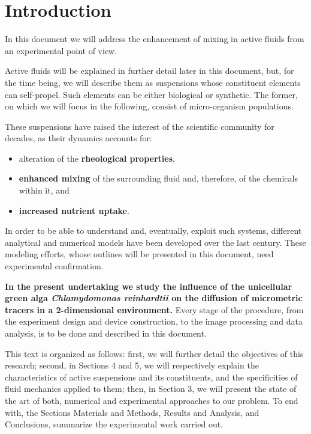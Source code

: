 \chapter{Introduction}
\label{introduction}

In this document we will address the enhancement of mixing in active fluids from an experimental point of view. 

Active fluids will be explained in further detail later in this document, but, for the time being, we will describe them as suspensions whose constituent elements can self-propel. Such elements can be either biological or synthetic. The former, on which we will focus in the following, consist of micro-organism populations.

These suspensions have raised the interest of the scientific community for decades, as their dynamics accounts for:

\begin{itemize}
	\item alteration of the \textbf{rheological properties},
	\item \textbf{enhanced mixing} of the surrounding fluid and, therefore, of the chemicals within it, and
	\item \textbf{increased nutrient uptake}.
\end{itemize}

In order to be able to understand and, eventually, exploit such systems, different analytical and numerical models have been developed over the last century. These modeling efforts, whose outlines will be presented in this document, need experimental confirmation.

\textbf{In the present undertaking we study the influence of the unicellular green alga \textit{Chlamydomonas reinhardtii} on the diffusion of micrometric tracers in a 2-dimensional environment.} 
Every stage of the procedure, from the experiment design and device construction, to the image processing and data analysis, is to be done and described in this document.

This text is organized as follows: first, we will further detail the objectives of this research; second,  in Sections 4 and 5, we will respectively explain the characteristics of active suspensions and its constituents, and the specificities of fluid mechanics applied to them; then, in Section 3, we will present the state of the art of both, numerical and experimental approaches to our problem. To end with, the Sections Materials and Methods, Results and Analysis, and Conclusions, summarize the experimental work carried out. 